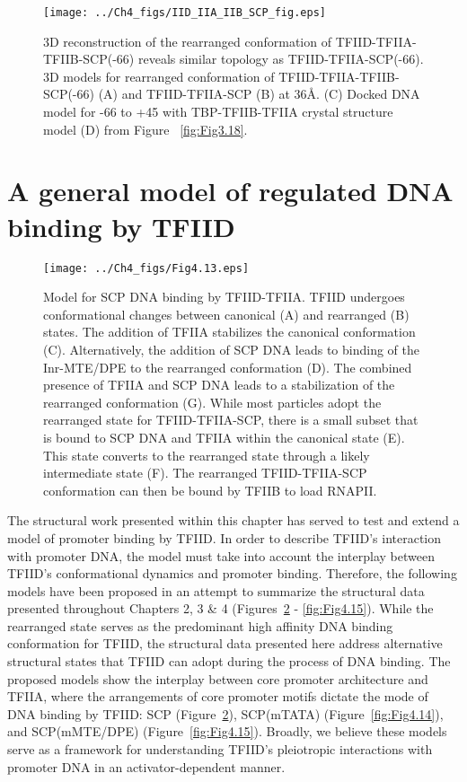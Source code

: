 \begin{figure}
\centering
\texttt{[image: ../Ch4\_figs/IID\_IIA\_IIB\_SCP\_fig.eps]}
\caption[3D reconstruction of the rearranged conformation of TFIID-TFIIA-TFIIB-SCP(-66) reveals similar topology as TFIID-TFIIA-SCP(-66)]{3D reconstruction of the rearranged conformation of TFIID-TFIIA-TFIIB-SCP(-66) reveals similar topology as TFIID-TFIIA-SCP(-66). 3D models for rearranged conformation of TFIID-TFIIA-TFIIB-SCP(-66) (A) and TFIID-TFIIA-SCP (B) at 36\AA. (C) Docked DNA model for -66 to +45 with TBP-TFIIB-TFIIA crystal structure model (D) from Figure ~\ref{fig:Fig3.18}. }
\label{fig:IIB_cryo}
\end{figure}

\section{A general model of regulated DNA binding by TFIID}
\begin{figure}
\centering
\texttt{[image: ../Ch4\_figs/Fig4.13.eps]}
\caption[Model for SCP DNA binding by TFIID-TFIIA]{Model for SCP DNA binding by TFIID-TFIIA. TFIID undergoes conformational changes between canonical (A) and rearranged (B) states. The addition of TFIIA stabilizes the canonical conformation (C). Alternatively, the addition of SCP DNA leads to binding of the Inr-MTE/DPE to the rearranged conformation (D).  The combined presence of TFIIA and SCP DNA leads to a stabilization of the rearranged conformation (G).  While most particles adopt the rearranged state for TFIID-TFIIA-SCP, there is a small subset that is bound to SCP DNA and TFIIA within the canonical state (E). This state converts to the rearranged state through a likely intermediate state (F). The rearranged TFIID-TFIIA-SCP conformation can then be bound by TFIIB to load RNAPII.}
\label{fig:Fig4.13}
\end{figure}

The structural work presented within this chapter has served to test and extend a model of promoter binding by TFIID. In order to describe TFIID's interaction with promoter DNA, the model must take into account the interplay between TFIID's conformational dynamics and promoter binding. Therefore, the following models have been proposed in an attempt to summarize the structural data presented throughout Chapters 2, 3 \& 4 (Figures~\ref{fig:Fig4.13} - \ref{fig:Fig4.15}). While the rearranged state serves as the predominant high affinity DNA binding conformation for TFIID, the structural data presented here address alternative structural states that TFIID can adopt during the process of DNA binding. The proposed models show the interplay between core promoter architecture and TFIIA, where the arrangements of core promoter motifs dictate the mode of DNA binding by TFIID: SCP (Figure~\ref{fig:Fig4.13}), SCP(mTATA) (Figure~\ref{fig:Fig4.14}), and SCP(mMTE/DPE) (Figure~\ref{fig:Fig4.15}). Broadly, we believe these models serve as a framework for understanding TFIID's pleiotropic interactions with promoter DNA in an activator-dependent manner.\\

